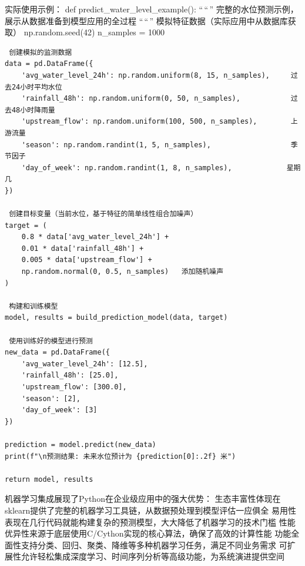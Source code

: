  实际使用示例： def predict\_water\_level\_example(): ``\,``\,'' 完整的水位预测示例，展示从数据准备到模型应用的全过程 ``\,``\,''  模拟特征数据（实际应用中从数据库获取） np.random.seed(42) n\_samples = 1000

\begin{verbatim}
 创建模拟的监测数据
data = pd.DataFrame({
    'avg_water_level_24h': np.random.uniform(8, 15, n_samples),     过去24小时平均水位
    'rainfall_48h': np.random.uniform(0, 50, n_samples),            过去48小时降雨量
    'upstream_flow': np.random.uniform(100, 500, n_samples),        上游流量
    'season': np.random.randint(1, 5, n_samples),                   季节因子
    'day_of_week': np.random.randint(1, 8, n_samples),             星期几
})

 创建目标变量（当前水位，基于特征的简单线性组合加噪声）
target = (
    0.8 * data['avg_water_level_24h'] + 
    0.01 * data['rainfall_48h'] +
    0.005 * data['upstream_flow'] +
    np.random.normal(0, 0.5, n_samples)   添加随机噪声
)

 构建和训练模型
model, results = build_prediction_model(data, target)

 使用训练好的模型进行预测
new_data = pd.DataFrame({
    'avg_water_level_24h': [12.5],
    'rainfall_48h': [25.0],
    'upstream_flow': [300.0],
    'season': [2],
    'day_of_week': [3]
})

prediction = model.predict(new_data)
print(f"\n预测结果: 未来水位预计为 {prediction[0]:.2f} 米")

return model, results
\end{verbatim}

 机器学习集成展现了Python在企业级应用中的强大优势：  生态丰富性体现在sklearn提供了完整的机器学习工具链，从数据预处理到模型评估一应俱全  易用性表现在几行代码就能构建复杂的预测模型，大大降低了机器学习的技术门槛  性能优异性来源于底层使用C/Cython实现的核心算法，确保了高效的计算性能  功能全面性支持分类、回归、聚类、降维等多种机器学习任务，满足不同业务需求  可扩展性允许轻松集成深度学习、时间序列分析等高级功能，为系统演进提供空间

